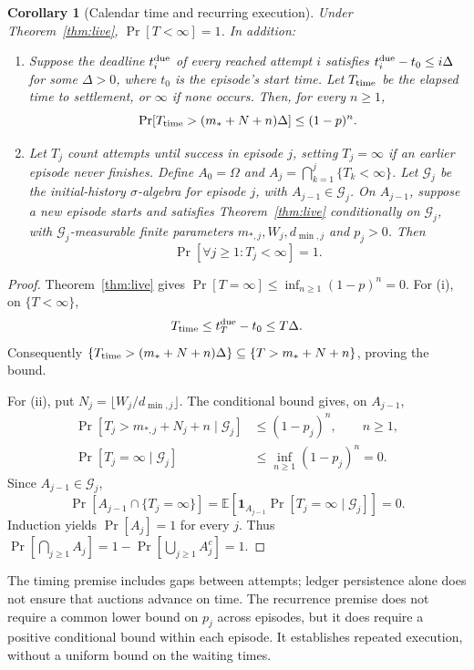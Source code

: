 \documentclass[10pt,letterpaper]{article}
\newtheorem{corollary}{Corollary}
\begin{document}
\begin{corollary}[Calendar time and recurring execution]
\label{cor:recurrence}
Under Theorem~\ref{thm:live}, $\Pr[T<\infty]=1$. In addition:
\begin{enumerate}[label=(\roman*)]
\item Suppose the deadline $t_i^{\rm due}$ of every reached attempt $i$ satisfies $t_i^{\rm due}-t_0\leq i\Delta$ for some $\Delta>0$, where $t_0$ is the episode's start time. Let $T_{\rm time}$ be the elapsed time to settlement, or $\infty$ if none occurs. Then, for every $n\geq1$,
\[
 \Pr[T_{\rm time}>(m_*+N+n)\Delta]\leq(1-p)^n.
\]
\item Let $T_j$ count attempts until success in episode $j$, setting $T_j=\infty$ if an earlier episode never finishes. Define $A_0=\Omega$ and $A_j=\bigcap_{k=1}^{j}\{T_k<\infty\}$. Let $\mathcal G_j$ be the initial-history $\sigma$-algebra for episode $j$, with $A_{j-1}\in\mathcal G_j$. On $A_{j-1}$, suppose a new episode starts and satisfies Theorem~\ref{thm:live} conditionally on $\mathcal G_j$, with $\mathcal G_j$-measurable finite parameters $m_{*,j},W_j,d_{\min,j}$ and $p_j>0$. Then
\[
 \Pr[\forall j\geq1:T_j<\infty]=1.
\]
\end{enumerate}
\end{corollary}
\begin{proof}
Theorem~\ref{thm:live} gives $\Pr[T=\infty]\leq\inf_{n\geq1}(1-p)^n=0$. For (i), on $\{T<\infty\}$,
\[
 T_{\rm time}\leq t_T^{\rm due}-t_0\leq T\Delta.
\]
Consequently $\{T_{\rm time}>(m_*+N+n)\Delta\}\subseteq\{T>m_*+N+n\}$, proving the bound.

For (ii), put $N_j=\lfloor W_j/d_{\min,j}\rfloor$. The conditional bound gives, on $A_{j-1}$,
\begin{align*}
 \Pr[T_j>m_{*,j}+N_j+n\mid\mathcal G_j]&\leq(1-p_j)^n,\qquad n\geq1,\\
 \Pr[T_j=\infty\mid\mathcal G_j]
 &\leq\inf_{n\geq1}(1-p_j)^n=0.
\end{align*}
Since $A_{j-1}\in\mathcal G_j$,
\[
 \Pr[A_{j-1}\cap\{T_j=\infty\}]
 =\mathbb E\!\left[\mathbf 1_{A_{j-1}}
                  \Pr[T_j=\infty\mid\mathcal G_j]\right]=0.
\]
Induction yields $\Pr[A_j]=1$ for every $j$. Thus
$\Pr[\bigcap_{j\geq1}A_j]=1-\Pr[\bigcup_{j\geq1}A_j^c]=1$.
\end{proof}

The timing premise includes gaps between attempts; ledger persistence alone does not ensure that auctions advance on time. The recurrence premise does not require a common lower bound on $p_j$ across episodes, but it does require a positive conditional bound within each episode. It establishes repeated execution, without a uniform bound on the waiting times.
\end{document}
